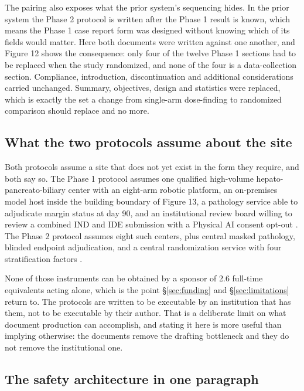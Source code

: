 The pairing also exposes what the prior system's sequencing hides. In the prior
system the Phase 2 protocol is written after the Phase 1 result is known, which
means the Phase 1 case report form was designed without knowing which of its
fields would matter. Here both documents were written against one another, and
Figure 12 shows the consequence: only four of the twelve Phase 1 sections had to
be replaced when the study randomized, and none of the four is a data-collection
section. Compliance, introduction, discontinuation and additional considerations
carried unchanged. Summary, objectives, design and statistics were replaced,
which is exactly the set a change from single-arm dose-finding to randomized
comparison should replace and no more.

\subsection{What the two protocols assume about the site}

Both protocols assume a site that does not yet exist in the form they require,
and both say so. The Phase 1 protocol assumes one qualified high-volume
hepato-pancreato-biliary center with an eight-arm robotic platform, an
on-premises model host inside the building boundary of Figure 13, a pathology
service able to adjudicate margin status at day 90, and an institutional review
board willing to review a combined IND and IDE submission with a Physical AI
consent opt-out \cite{onpremwhippl}. The Phase 2 protocol assumes eight such
centers, plus central masked pathology, blinded endpoint adjudication, and a
central randomization service with four stratification factors
\cite{phase2proto}.

None of those instruments can be obtained by a sponsor of 2.6 full-time
equivalents acting alone, which is the point \S\ref{sec:funding} and \S\ref{sec:limitations} return to. The
protocols are written to be executable by an institution that has them, not to
be executable by their author. That is a deliberate limit on what document
production can accomplish, and stating it here is more useful than implying
otherwise: the documents remove the drafting bottleneck and they do not remove
the institutional one.

\subsection{The safety architecture in one paragraph}

